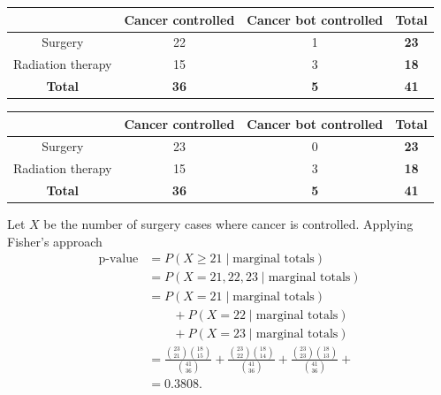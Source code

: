 \documentclass[a4paper]{article}\usepackage[]{graphicx}\usepackage[]{xcolor}
\begin{document}
\begin{table}[H]
	\centering
	\begin{tabular}{@{}c|cc|c@{}}
	\toprule
				      & \textbf{Cancer controlled} & \textbf{Cancer bot controlled} & \textbf{Total} \\ \midrule
	Surgery           & \textcolor{myred}{22}      & 1                              & \textbf{23}    \\
	Radiation therapy & 15                         & 3                              & \textbf{18}    \\ \midrule
	\textbf{Total}    & \textbf{36}                & \textbf{5}                     & \textbf{41}    \\ \bottomrule
	\end{tabular}
\end{table}
\begin{table}[H]
	\centering
	\begin{tabular}{@{}c|cc|c@{}}
	\toprule
				      & \textbf{Cancer controlled} & \textbf{Cancer bot controlled} & \textbf{Total} \\ \midrule
	Surgery           & \textcolor{myred}{23}      & 0                              & \textbf{23}    \\
	Radiation therapy & 15                         & 3                              & \textbf{18}    \\ \midrule
	\textbf{Total}    & \textbf{36}                & \textbf{5}                     & \textbf{41}    \\ \bottomrule
	\end{tabular}
\end{table}
Let \( X \) be the number of surgery cases where cancer is controlled. Applying Fisher's approach
\begin{align*}
	\text{p-value}  
	&= P (X \geq 21 \mid \text{marginal totals} )\\
	&= P (X = 21, 22, 23 \mid \text{marginal totals} )\\
	&= P (X = 21 \mid \text{marginal totals} ) \\
	  & \qquad {} + P (X = 22 \mid \text{marginal totals} )\\
	  & \qquad {} + P (X = 23 \mid \text{marginal totals} )\\
	&= \frac{\binom{23}{21} \binom{18}{15}}{\binom{41}{36}} + \frac{\binom{23}{22} \binom{18}{14}}{\binom{41}{36}} + \frac{\binom{23}{23} \binom{18}{13}}{\binom{41}{36}} + \\
	&=  0.3808.
\end{align*}
\end{document}
